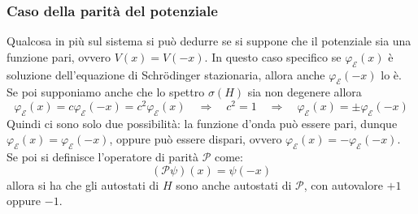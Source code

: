\documentclass[../../FisicaTeorica.tex]{subfiles}
\begin{document}
\subsubsection{Caso della parità del potenziale}
Qualcosa in più sul sistema si può dedurre se si suppone che il potenziale sia una funzione pari, ovvero $V(x) = V(-x)$. In questo caso specifico se $\varphi_\mathcal{E}(x)$ è soluzione dell'equazione di Schrödinger stazionaria, allora anche $\varphi_\mathcal{E}(-x)$ lo è. Se poi supponiamo anche che lo spettro $\sigma(H)$ sia non degenere allora
\[\varphi_\mathcal{E}(x)=c \varphi_\mathcal{E}(-x) = c^2\varphi_\mathcal{E}(x) \quad \Rightarrow \quad c^2 = 1 \quad \Rightarrow \quad \varphi_{\mathcal E}(x) = \pm \varphi_{\mathcal E}(-x)
\]
Quindi ci sono solo due possibilità: la funzione d'onda può essere pari, dunque $\varphi_\mathcal{E}(x) =\varphi_\mathcal{E}(-x)$, oppure può essere dispari, ovvero $\varphi_\mathcal{E}(x)=-\varphi_\mathcal{E}(-x)$.\\
Se poi si definisce l'operatore di parità $\mathcal{P}$ come:
\[
(\mathcal{P}\psi)(x)=\psi(-x)
\]
allora si ha che gli autostati di $H$ sono anche autostati di $\mathcal{P}$, con autovalore $+1$ oppure $-1$.
\end{document}
